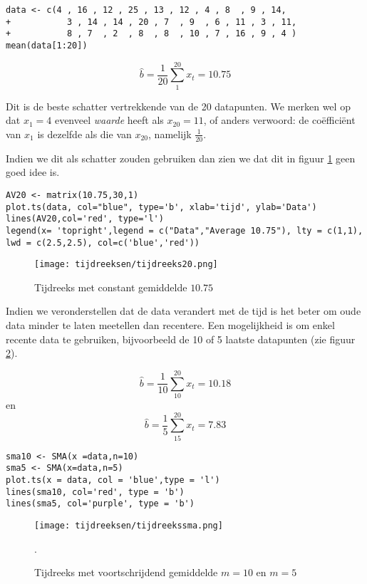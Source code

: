 \begin{lstlisting}
data <- c(4 , 16 , 12 , 25 , 13 , 12 , 4 , 8  , 9 , 14, 
+           3 , 14 , 14 , 20 , 7  , 9  , 6 , 11 , 3 , 11, 
+           8 , 7  , 2  , 8  , 8  , 10 , 7 , 16 , 9 , 4 )
mean(data[1:20])
\end{lstlisting}

\[ \widehat{b} = \frac{1}{20} \sum_{1}^{20} x_{t}= 10.75 \] 

Dit is de beste schatter vertrekkende van de 20 datapunten. We merken wel op dat $x_{1} =  4$ evenveel \textit{waarde} heeft als $x_{20} = 11$, of anders verwoord: de coëfficiënt van $x_{1}$ is dezelfde als die van $x_{20}$, namelijk $\frac{1}{20}$.

Indien we dit als schatter zouden gebruiken dan zien we dat dit in figuur \ref{fig:tijdreeks21} geen goed idee is.

\begin{lstlisting}
AV20 <- matrix(10.75,30,1)
plot.ts(data, col="blue", type='b', xlab='tijd', ylab='Data')
lines(AV20,col='red', type='l')
legend(x= 'topright',legend = c("Data","Average 10.75"), lty = c(1,1), lwd = c(2.5,2.5), col=c('blue','red'))
\end{lstlisting}

\begin{figure}
	\centering
		\texttt{[image: tijdreeksen/tijdreeks20.png]}
	\caption{Tijdreeks met constant gemiddelde $10.75$}
	\label{fig:tijdreeks21}
\end{figure}

Indien we veronderstellen dat de data verandert met de tijd is het beter om oude data minder te laten meetellen dan recentere. Een mogelijkheid is om enkel recente data te gebruiken, bijvoorbeeld de 10 of 5 laatste datapunten (zie figuur \ref{fig:tijdreeks31}).

\[ \widehat{b} = \frac{1}{10} \sum_{10}^{20} x_{t} = 10.18 \] en
\[ \widehat{b} = \frac{1}{5} \sum_{15}^{20} x_{t} = 7.83 \]

\begin{lstlisting}
sma10 <- SMA(x =data,n=10)
sma5 <- SMA(x=data,n=5)
plot.ts(x = data, col = 'blue',type = 'l')
lines(sma10, col='red', type = 'b')
lines(sma5, col='purple', type = 'b')
\end{lstlisting}

\begin{figure}
\centering
	\texttt{[image: tijdreeksen/tijdreekssma.png]}
	\caption{Tijdreeks met voortschrijdend gemiddelde $m = 10$ en $m=5$}. 
\label{fig:tijdreeks31}
\end{figure}

